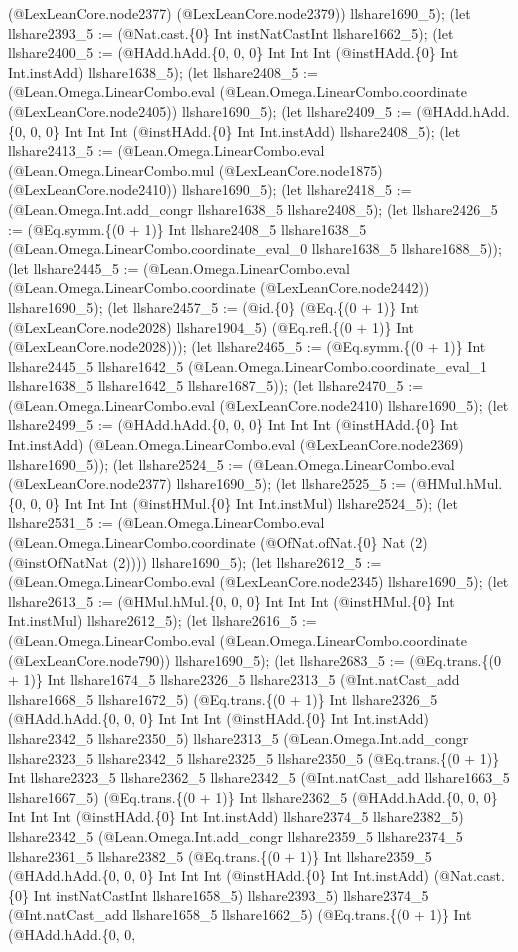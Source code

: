 \documentclass[11pt]{article}
\begin{document}
(@LexLeanCore.node2377) (@LexLeanCore.node2379)) llshare1690\_5); (let llshare2393\_5 := (@Nat.cast.\{0\} Int instNatCastInt llshare1662\_5); (let llshare2400\_5 := (@HAdd.hAdd.\{0, 0, 0\} Int Int Int (@instHAdd.\{0\} Int Int.instAdd) llshare1638\_5); (let llshare2408\_5 := (@Lean.Omega.LinearCombo.eval (@Lean.Omega.LinearCombo.coordinate (@LexLeanCore.node2405)) llshare1690\_5); (let llshare2409\_5 := (@HAdd.hAdd.\{0, 0, 0\} Int Int Int (@instHAdd.\{0\} Int Int.instAdd) llshare2408\_5); (let llshare2413\_5 := (@Lean.Omega.LinearCombo.eval (@Lean.Omega.LinearCombo.mul (@LexLeanCore.node1875) (@LexLeanCore.node2410)) llshare1690\_5); (let llshare2418\_5 := (@Lean.Omega.Int.add\_congr llshare1638\_5 llshare2408\_5); (let llshare2426\_5 := (@Eq.symm.\{(0 + 1)\} Int llshare2408\_5 llshare1638\_5 (@Lean.Omega.LinearCombo.coordinate\_eval\_0 llshare1638\_5 llshare1688\_5)); (let llshare2445\_5 := (@Lean.Omega.LinearCombo.eval (@Lean.Omega.LinearCombo.coordinate (@LexLeanCore.node2442)) llshare1690\_5); (let llshare2457\_5 := (@id.\{0\} (@Eq.\{(0 + 1)\} Int (@LexLeanCore.node2028) llshare1904\_5) (@Eq.refl.\{(0 + 1)\} Int (@LexLeanCore.node2028))); (let llshare2465\_5 := (@Eq.symm.\{(0 + 1)\} Int llshare2445\_5 llshare1642\_5 (@Lean.Omega.LinearCombo.coordinate\_eval\_1 llshare1638\_5 llshare1642\_5 llshare1687\_5)); (let llshare2470\_5 := (@Lean.Omega.LinearCombo.eval (@LexLeanCore.node2410) llshare1690\_5); (let llshare2499\_5 := (@HAdd.hAdd.\{0, 0, 0\} Int Int Int (@instHAdd.\{0\} Int Int.instAdd) (@Lean.Omega.LinearCombo.eval (@LexLeanCore.node2369) llshare1690\_5)); (let llshare2524\_5 := (@Lean.Omega.LinearCombo.eval (@LexLeanCore.node2377) llshare1690\_5); (let llshare2525\_5 := (@HMul.hMul.\{0, 0, 0\} Int Int Int (@instHMul.\{0\} Int Int.instMul) llshare2524\_5); (let llshare2531\_5 := (@Lean.Omega.LinearCombo.eval (@Lean.Omega.LinearCombo.coordinate (@OfNat.ofNat.\{0\} Nat (2) (@instOfNatNat (2)))) llshare1690\_5); (let llshare2612\_5 := (@Lean.Omega.LinearCombo.eval (@LexLeanCore.node2345) llshare1690\_5); (let llshare2613\_5 := (@HMul.hMul.\{0, 0, 0\} Int Int Int (@instHMul.\{0\} Int Int.instMul) llshare2612\_5); (let llshare2616\_5 := (@Lean.Omega.LinearCombo.eval (@Lean.Omega.LinearCombo.coordinate (@LexLeanCore.node790)) llshare1690\_5); (let llshare2683\_5 := (@Eq.trans.\{(0 + 1)\} Int llshare1674\_5 llshare2326\_5 llshare2313\_5 (@Int.natCast\_add llshare1668\_5 llshare1672\_5) (@Eq.trans.\{(0 + 1)\} Int llshare2326\_5 (@HAdd.hAdd.\{0, 0, 0\} Int Int Int (@instHAdd.\{0\} Int Int.instAdd) llshare2342\_5 llshare2350\_5) llshare2313\_5 (@Lean.Omega.Int.add\_congr llshare2323\_5 llshare2342\_5 llshare2325\_5 llshare2350\_5 (@Eq.trans.\{(0 + 1)\} Int llshare2323\_5 llshare2362\_5 llshare2342\_5 (@Int.natCast\_add llshare1663\_5 llshare1667\_5) (@Eq.trans.\{(0 + 1)\} Int llshare2362\_5 (@HAdd.hAdd.\{0, 0, 0\} Int Int Int (@instHAdd.\{0\} Int Int.instAdd) llshare2374\_5 llshare2382\_5) llshare2342\_5 (@Lean.Omega.Int.add\_congr llshare2359\_5 llshare2374\_5 llshare2361\_5 llshare2382\_5 (@Eq.trans.\{(0 + 1)\} Int llshare2359\_5 (@HAdd.hAdd.\{0, 0, 0\} Int Int Int (@instHAdd.\{0\} Int Int.instAdd) (@Nat.cast.\{0\} Int instNatCastInt llshare1658\_5) llshare2393\_5) llshare2374\_5 (@Int.natCast\_add llshare1658\_5 llshare1662\_5) (@Eq.trans.\{(0 + 1)\} Int (@HAdd.hAdd.\{0, 0, 
\end{document}

